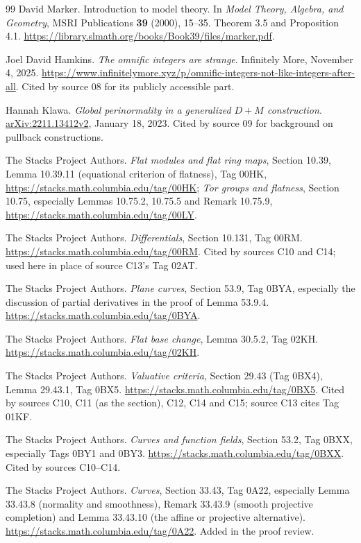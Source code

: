 \documentclass[11pt,oneside]{article}
\numberwithin{equation}{section}
\theoremstyle{definition}
\theoremstyle{remark}
\begin{document}
\begin{thebibliography}{99}
David Marker.
Introduction to model theory.
In \emph{Model Theory, Algebra, and Geometry}, MSRI Publications
\textbf{39} (2000), 15--35. Theorem 3.5 and Proposition 4.1.
\url{https://library.slmath.org/books/Book39/files/marker.pdf}.

Joel David Hamkins.
\emph{The omnific integers are strange}. Infinitely More, November 4, 2025.
\url{https://www.infinitelymore.xyz/p/omnific-integers-not-like-integers-after-all}.
Cited by source 08 for its publicly accessible part.

Hannah Klawa.
\emph{Global perinormality in a generalized $D+M$ construction}.
\href{https://arxiv.org/abs/2211.13412v2}{arXiv:2211.13412v2}, January 18,
2023. Cited by source 09 for background on pullback constructions.

The Stacks Project Authors.
\emph{Flat modules and flat ring maps}, Section 10.39, Lemma 10.39.11
(equational criterion of flatness), Tag 00HK,
\url{https://stacks.math.columbia.edu/tag/00HK};
\emph{Tor groups and flatness}, Section 10.75, especially Lemmas 10.75.2,
10.75.5 and Remark 10.75.9,
\url{https://stacks.math.columbia.edu/tag/00LY}.

The Stacks Project Authors.
\emph{Differentials}, Section 10.131, Tag 00RM.
\url{https://stacks.math.columbia.edu/tag/00RM}. Cited by sources C10 and C14; used
here in place of source C13's Tag 02AT.

The Stacks Project Authors.
\emph{Plane curves}, Section 53.9, Tag 0BYA, especially the discussion of
partial derivatives in the proof of Lemma 53.9.4.
\url{https://stacks.math.columbia.edu/tag/0BYA}.

The Stacks Project Authors.
\emph{Flat base change}, Lemma 30.5.2, Tag 02KH.
\url{https://stacks.math.columbia.edu/tag/02KH}.

The Stacks Project Authors.
\emph{Valuative criteria}, Section 29.43 (Tag 0BX4), Lemma 29.43.1, Tag 0BX5.
\url{https://stacks.math.columbia.edu/tag/0BX5}. Cited by sources C10, C11 (as the
section), C12, C14 and C15; source C13 cites Tag 01KF.

The Stacks Project Authors.
\emph{Curves and function fields}, Section 53.2, Tag 0BXX, especially Tags 0BY1 and
0BY3. \url{https://stacks.math.columbia.edu/tag/0BXX}. Cited by sources C10--C14.

The Stacks Project Authors.
\emph{Curves}, Section 33.43, Tag 0A22, especially Lemma 33.43.8
(normality and smoothness), Remark 33.43.9 (smooth projective completion)
and Lemma 33.43.10 (the affine or projective alternative).
\url{https://stacks.math.columbia.edu/tag/0A22}. Added in the proof review.


\end{thebibliography}
\end{document}
